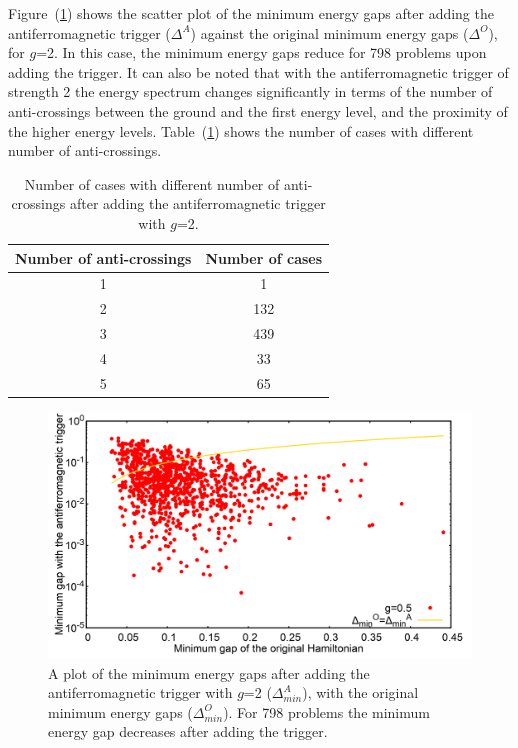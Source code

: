 \documentclass[../main.tex]{subfiles}
\begin{document}
Figure~(\ref{fig:a39}) shows the scatter plot of the minimum energy gaps after adding the antiferromagnetic trigger ($\Delta^A$) against the original minimum energy gaps ($\Delta^O$), for $g$=2. In this case, the minimum energy gaps reduce for 798 problems upon adding the trigger. It can also be noted that with the antiferromagnetic trigger of strength 2 the energy spectrum changes significantly in terms of the number of anti-crossings between the ground and the first energy level, and the proximity of the higher energy levels. Table~(\ref{tab:a5}) shows the number of cases with different number of anti-crossings.
\begin{table}[H]
\centering
\renewcommand{\arraystretch}{1.5}
\begin{tabular}{|c|c|}
\hline 
Number of anti-crossings & Number of cases \\ 
\hline 
1 & 1 \\ 
\hline 
2 & 132 \\ 
\hline 
3 & 439 \\ 
\hline 
4 & 33 \\ 
\hline 
5 & 65 \\
\hline
\end{tabular} 
\caption{Number of cases with different number of anti-crossings after adding the antiferromagnetic trigger with $g$=2.}
\label{tab:a5}

\end{table}
\begin{figure}
\centering 
\includegraphics[scale=0.2]{MinGap_A_g2.png}
\caption{A plot of the minimum energy gaps after adding the antiferromagnetic trigger with $g$=2 ($\Delta_{min}^A$), with the original minimum energy gaps ($\Delta_{min}^O$). For 798 problems the minimum energy gap decreases after adding the trigger.}
\label{fig:a39}
\end{figure}
\end{document}
